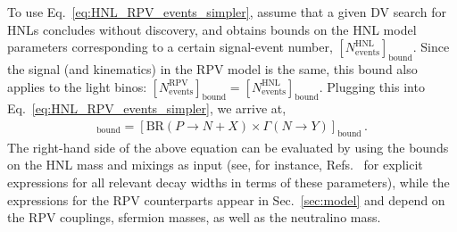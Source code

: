 \begin{itemize}
    To use Eq.~\eqref{eq:HNL_RPV_events_simpler}, assume that a given DV search for HNLs concludes without discovery, and obtains bounds on the HNL model parameters corresponding to a certain signal-event number, $[N_{\text{events}}^{\text{HNL}}]_{\text{bound}}$.
    Since the signal (and kinematics) in the RPV model is the same, this bound also applies to the light binos: $[N_{\text{events}}^{\text{RPV}}]_{\text{bound}} = [N_{\text{events}}^{\text{HNL}}]_{\text{bound}}$. Plugging this into Eq.~\eqref{eq:HNL_RPV_events_simpler}, we arrive at,
    \begin{align}
        [\text{BR}(P\to \tilde{\chi}^0_1+X') \times \Gamma(\tilde{\chi}^0_1\to Y)]_{\text{bound}}=[\text{BR}(P\to N+X) \times \Gamma(N\to Y)]_{\text{bound}}\,.
    \end{align}
    The right-hand side of the above equation can be evaluated by using the bounds on the HNL mass and mixings as input (see, for instance, Refs.~\cite{Gorbunov:2007ak, Bondarenko:2018ptm} for explicit expressions for all relevant decay widths in terms of these parameters), while the expressions for the RPV counterparts appear in Sec.~\ref{sec:model} and depend on the RPV couplings, sfermion masses, as well as the neutralino mass.
\end{itemize}
